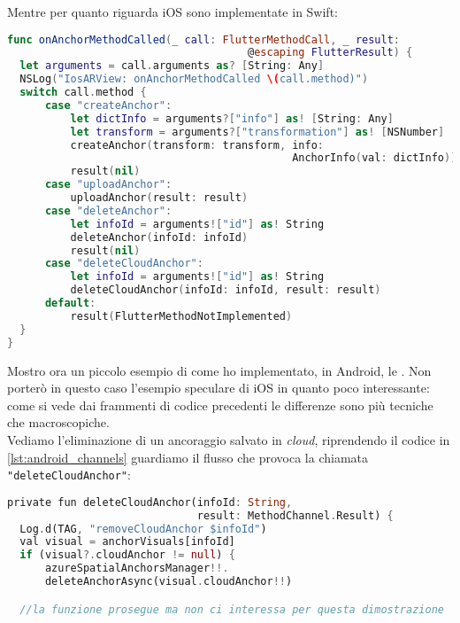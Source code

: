 Mentre per quanto riguarda iOS sono implementate in Swift:

\begin{lstlisting}[language=swift, label={lst:ios_channels}, firstnumber=1,caption={iOS chiamate dei \textit{method channel} per effettuare \textit{create, delete, ulpoad, delete cloud anchor}}]
func onAnchorMethodCalled(_ call: FlutterMethodCall, _ result: 
                                      @escaping FlutterResult) {
  let arguments = call.arguments as? [String: Any]
  NSLog("IosARView: onAnchorMethodCalled \(call.method)")
  switch call.method {
      case "createAnchor":
          let dictInfo = arguments?["info"] as! [String: Any]
          let transform = arguments?["transformation"] as! [NSNumber]
          createAnchor(transform: transform, info: 
                                             AnchorInfo(val: dictInfo))
          result(nil)
      case "uploadAnchor":
          uploadAnchor(result: result)
      case "deleteAnchor":
          let infoId = arguments!["id"] as! String
          deleteAnchor(infoId: infoId)
          result(nil)
      case "deleteCloudAnchor":
          let infoId = arguments!["id"] as! String
          deleteCloudAnchor(infoId: infoId, result: result)
      default:
          result(FlutterMethodNotImplemented)
  }
}
\end{lstlisting}

Mostro ora un piccolo esempio di come ho implementato, in Android, le \asa{}. Non porterò in questo caso l'esempio speculare di iOS in quanto poco interessante: come si vede dai frammenti di codice precedenti le differenze sono più tecniche che macroscopiche.\\
Vediamo l'eliminazione di un ancoraggio salvato in \textit{cloud}, riprendendo il codice in \ref{lst:android_channels} guardiamo il flusso che provoca la chiamata \verb+"deleteCloudAnchor"+:

\begin{lstlisting}[language=dart, label={lst:asa_android_call}, firstnumber=1,caption={Eliminazione \textit{cloud anchor} lato Android, chiamata}]
private fun deleteCloudAnchor(infoId: String,
                              result: MethodChannel.Result) {
  Log.d(TAG, "removeCloudAnchor $infoId")
  val visual = anchorVisuals[infoId]
  if (visual?.cloudAnchor != null) {
      azureSpatialAnchorsManager!!.
      deleteAnchorAsync(visual.cloudAnchor!!)

  //la funzione prosegue ma non ci interessa per questa dimostrazione
\end{lstlisting}

